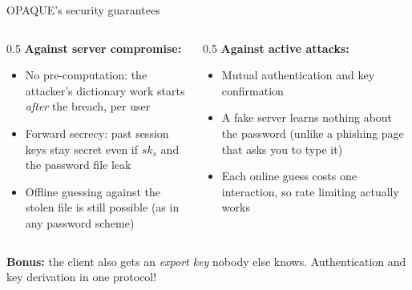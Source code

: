 \ifdefined\PRESENTATION\else\PassOptionsToClass{handout}{beamer}\fi\documentclass[aspectratio=169, lualatex]{beamer}
\begin{document}
\begin{frame}{OPAQUE's security guarantees}
	\begin{columns}[c]
		\begin{column}{0.5\textwidth}
			\textbf{Against server compromise:}
			\begin{itemize}
				\item[\textcolor{green}{\mycheckmark}] No pre-computation: the attacker's dictionary work starts \textit{after} the breach, per user
				\item[\textcolor{green}{\mycheckmark}] Forward secrecy: past session keys stay secret even if $sk_s$ and the password file leak
				\item[\textcolor{red}{$\times$}] Offline guessing against the stolen file is still possible (as in any password scheme)
			\end{itemize}
		\end{column}
		\begin{column}{0.5\textwidth}
			\textbf{Against active attacks:}
			\begin{itemize}
				\item[\textcolor{green}{\mycheckmark}] Mutual authentication and key confirmation
				\item[\textcolor{green}{\mycheckmark}] A fake server learns nothing about the password (unlike a phishing page that asks you to type it)
				\item[\textcolor{green}{\mycheckmark}] Each online guess costs one interaction, so rate limiting actually works
			\end{itemize}
		\end{column}
	\end{columns}
	\vspace{0.3cm}
	\begin{center}
		\textbf{Bonus:} the client also gets an \textit{export key} nobody else knows. Authentication and key derivation in one protocol!
	\end{center}
\end{frame}
\end{document}
